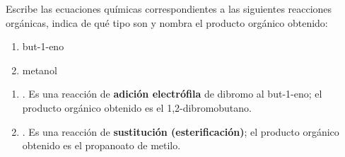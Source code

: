 \begin{exerciseEVAU}
    Escribe las ecuaciones químicas correspondientes a las siguientes reacciones orgánicas, indica de qué tipo son y nombra el producto orgánico obtenido:

    \begin{enumerate}[label=\letraminuscula]
        \item but-1-eno 
        \item {} \ch{+} metanol \ch{->}
    \end{enumerate}
    \begin{solu}
        \begin{enumerate}[label=\letraminuscula]
            \item {}. Es una reacción de \textbf{adición electrófila} de dibromo al but-1-eno; el producto orgánico obtenido es el 1,2-dibromobutano.

            \item {}. Es una reacción de \textbf{sustitución (esterificación)}; el producto orgánico obtenido es el propanoato de metilo.
        \end{enumerate}
    \end{solu}
\end{exerciseEVAU}

